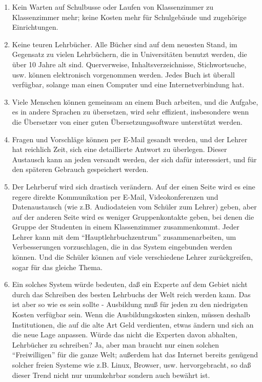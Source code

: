 \begin{enumerate}[label={\roman*.}] 
\item Kein Warten auf Schulbusse oder Laufen von Klassenzimmer zu Klassenzimmer mehr; keine Kosten mehr für Schulgebäude und zugehörige Einrichtungen.
\item Keine teuren Lehrbücher.
Alle Bücher sind auf dem neuesten Stand, im Gegensatz zu vielen Lehrbüchern, die in Universitäten benutzt werden, die über 10 Jahre alt sind.
Querverweise, Inhaltsverzeichnisse, Stichwortsuche, usw. können elektronisch vorgenommen werden.
Jedes Buch ist überall verfügbar, solange man einen Computer und eine Internetverbindung hat.
\item Viele Menschen können gemeinsam an einem Buch arbeiten, und die Aufgabe, es in andere Sprachen zu übersetzen, wird sehr effizient, insbesondere wenn die Übersetzer von einer guten Übersetzungssoftware unterstützt werden.
\item Fragen und Vorschläge können per E-Mail gesandt werden, und der Lehrer hat reichlich Zeit, sich eine detaillierte Antwort zu überlegen.
Dieser Austausch kann an jeden versandt werden, der sich dafür interessiert, und für den späteren Gebrauch gespeichert werden.
\item Der Lehrberuf wird sich drastisch verändern.
Auf der einen Seite wird es eine regere direkte Kommunikation per E-Mail, Videokonferenzen und Datenaustausch (wie z.B. Audiodateien vom Schüler zum Lehrer) geben,
aber auf der anderen Seite wird es weniger Gruppenkontakte geben, bei denen die Gruppe der Studenten in einem Klassenzimmer zusammenkommt.
Jeder Lehrer kann mit dem \enquote{Hauptlehrbuchzentrum} zusammenarbeiten, um Verbesserungen vorzuschlagen, die in das System eingebunden werden können.
Und die Schüler können auf viele verschiedene Lehrer zurückgreifen, sogar für das gleiche Thema.
\item Ein solches System würde bedeuten, daß ein Experte auf dem Gebiet nicht durch das Schreiben des besten Lehrbuchs der Welt reich werden kann.
Das ist aber so wie es sein sollte - Ausbildung muß für jeden zu den niedrigsten Kosten verfügbar sein.
Wenn die Ausbildungskosten sinken, müssen deshalb Institutionen, die auf die alte Art Geld verdienten, etwas ändern und sich an die neue Lage anpassen.
Würde das nicht die Experten davon abhalten, Lehrbücher zu schreiben?
Ja, aber man braucht nur einen solchen \enquote{Freiwilligen} für die ganze Welt; außerdem hat das Internet bereits genügend solcher freien Systeme wie z.B. Linux, Browser, usw. hervorgebracht, so daß dieser Trend nicht nur unumkehrbar sondern auch bewährt ist.

\end{enumerate}
